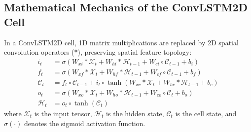 \documentclass[12pt,a4paper,oneside]{report}
\begin{document}
\subsection{Mathematical Mechanics of the ConvLSTM2D Cell}
In a ConvLSTM2D cell, 1D matrix multiplications are replaced by 2D spatial convolution operators ($*$), preserving spatial feature topology:
\begin{align}
i_t &= \sigma\left(W_{xi} * \mathcal{X}_t + W_{hi} * \mathcal{H}_{t-1} + W_{ci} \circ \mathcal{C}_{t-1} + b_i\right) \\
f_t &= \sigma\left(W_{xf} * \mathcal{X}_t + W_{hf} * \mathcal{H}_{t-1} + W_{cf} \circ \mathcal{C}_{t-1} + b_f\right) \\
\mathcal{C}_t &= f_t \circ \mathcal{C}_{t-1} + i_t \circ \tanh\left(W_{xc} * \mathcal{X}_t + W_{hc} * \mathcal{H}_{t-1} + b_c\right) \\
o_t &= \sigma\left(W_{xo} * \mathcal{X}_t + W_{ho} * \mathcal{H}_{t-1} + W_{co} \circ \mathcal{C}_t + b_o\right) \\
\mathcal{H}_t &= o_t \circ \tanh\left(\mathcal{C}_t\right)
\end{align}
where $\mathcal{X}_t$ is the input tensor, $\mathcal{H}_t$ is the hidden state, $\mathcal{C}_t$ is the cell state, and $\sigma(\cdot)$ denotes the sigmoid activation function.
\end{document}
